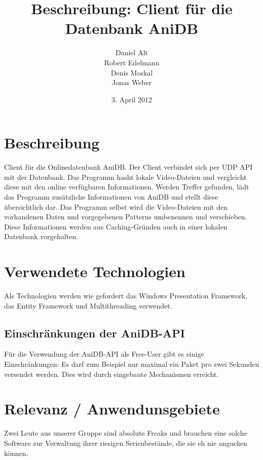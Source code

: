 \documentclass{scrartcl}
\title{Beschreibung: Client für die Datenbank AniDB}
\author{Daniel Alt\\Robert Edelmann\\Denis Moskal\\Jonas Weber}
\date{3. April 2012}
\begin{document}
\maketitle

\section*{Beschreibung}

Client für die Onlinedatenbank AniDB.
Der Client verbindet sich per UDP API mit der Datenbank. Das Programm hasht lokale Video-Dateien und 
vergleicht diese mit den online verfügbaren Informationen. Werden Treffer gefunden, lädt das Programm
zusätzliche Informationen von AniDB und stellt diese übersichtlich dar. Das Programm selbst wird die Video-Dateien mit 
den vorhandenen Daten und vorgegebenen Patterns umbenennen und verschieben.
Diese Informationen werden aus Caching-Gründen auch in einer lokalen Datenbank vorgehalten.

\section*{Verwendete Technologien}

Als Technologien werden wie gefordert das Windows Presentation Framework, das Entity Framework und Multithreading
verwendet.

\subsection*{Einschränkungen der AniDB-API}

Für die Verwendung der AniDB-API als Free-User gibt es einige Einschränkungen: Es darf zum Beispiel
nur maximal ein Paket pro zwei Sekunden versendet werden. Dies wird durch eingebaute Mechanismen erreicht.

\section*{Relevanz / Anwendunsgebiete}

Zwei Leute aus unserer Gruppe sind absolute Freaks und brauchen eine solche Software zur Verwaltung
ihrer riesigen Serienbestände, die sie eh nie angucken können.
\end{document}
